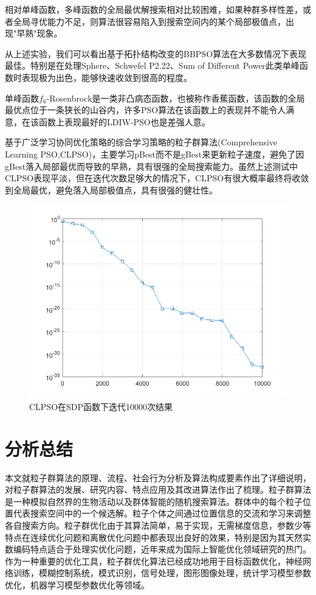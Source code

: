 相对单峰函数，多峰函数的全局最优解搜索相对比较困难，如果种群多样性差，或者全局寻优能力不足，则算法很容易陷入到搜索空间内的某个局部极值点，出现"早熟"现象。

从上述实验，我们可以看出基于拓扑结构改变的BBPSO算法在大多数情况下表现最佳。特别是在处理Sphere、Schwefel P2.22、Sum of Different Power此类单峰函数时表现极为出色，能够快速收敛到很高的程度。

单峰函数$f_6$-Rosenbrock是一类非凸病态函数，也被称作香蕉函数，该函数的全局最优点位于一条狭长的山谷内，许多PSO算法在该函数上的表现并不能令人满意，在该函数上表现最好的LDIW-PSO也是差强人意。

基于广泛学习协同优化策略的综合学习策略的粒子群算法(Comprehensive Learning PSO,CLPSO)，主要学习pBest而不是gBest来更新粒子速度，避免了因gBest落入局部最优而导致的早熟，具有很强的全局搜索能力。虽然上述测试中CLPSO表现平淡，但在迭代次数足够大的情况下，CLPSO有很大概率最终将收敛到全局最优，避免落入局部极值点，具有很强的健壮性。
\begin{figure}[H]
	\centering

	\includegraphics[width=\linewidth]{pic/10000}
	\caption{CLPSO在SDP函数下迭代10000次结果}
	\label{figCLPSOmaxg10000Line}
\end{figure}

\newpage
\section{分析总结}
本文就粒子群算法的原理、流程、社会行为分析及算法构成要素作出了详细说明，对粒子群算法的发展、研究内容、特点应用及其改进算法作出了梳理。粒子群算法是一种模拟自然界的生物活动以及群体智能的随机搜索算法。群体中的每个粒子位置代表搜索空间中的一个候选解。粒子个体之间通过位置信息的交流和学习来调整各自搜索方向。粒子群优化由于其算法简单，易于实现，无需梯度信息，参数少等特点在连续优化问题和离散优化问题中都表现出良好的效果，特别是因为其天然实数编码特点适合于处理实优化问题，近年来成为国际上智能优化领域研究的热门。作为一种重要的优化工具，粒子群优化算法已经成功地用于目标函数优化，神经网络训练，模糊控制系统，模式识别，信号处理，图形图像处理，统计学习模型参数优化，机器学习模型参数优化等领域。

